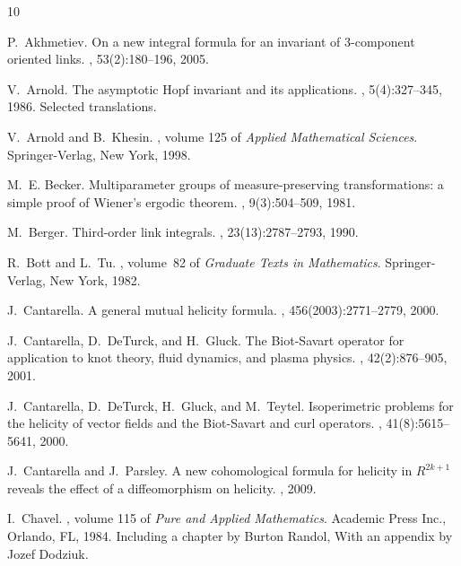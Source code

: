 \documentclass[12pt]{article}
\numberwithin{equation}{section}
\begin{document}
\begin{thebibliography}{10}

P.~Akhmetiev.
\newblock On a new integral formula for an invariant of 3-component oriented
  links.
, 53(2):180--196, 2005.

V.~Arnold.
\newblock The asymptotic {H}opf invariant and its applications.
, 5(4):327--345, 1986.
\newblock Selected translations.

V.~Arnold and B.~Khesin.
, volume 125 of {\em
  Applied Mathematical Sciences}.
\newblock Springer-Verlag, New York, 1998.

M.~E. Becker.
\newblock Multiparameter groups of measure-preserving transformations: a simple
  proof of {W}iener's ergodic theorem.
, 9(3):504--509, 1981.

M.~Berger.
\newblock Third-order link integrals.
, 23(13):2787--2793, 1990.

R.~Bott and L.~Tu.
, volume~82 of {\em
  Graduate Texts in Mathematics}.
\newblock Springer-Verlag, New York, 1982.

J.~Cantarella.
\newblock A general mutual helicity formula.
,
  456(2003):2771--2779, 2000.

J.~Cantarella, D.~DeTurck, and H.~Gluck.
\newblock The {B}iot-{S}avart operator for application to knot theory, fluid
  dynamics, and plasma physics.
, 42(2):876--905, 2001.

J.~Cantarella, D.~DeTurck, H.~Gluck, and M.~Teytel.
\newblock Isoperimetric problems for the helicity of vector fields and the
  {B}iot-{S}avart and curl operators.
, 41(8):5615--5641, 2000.

J.~Cantarella and J.~Parsley.
\newblock A new cohomological formula for helicity in ${R}^{2k+1}$ reveals the
  effect of a diffeomorphism on helicity.
, 2009.

I.~Chavel.
, volume 115 of {\em Pure
  and Applied Mathematics}.
\newblock Academic Press Inc., Orlando, FL, 1984.
\newblock Including a chapter by Burton Randol, With an appendix by Jozef
  Dodziuk.


\end{thebibliography}
\end{document}
